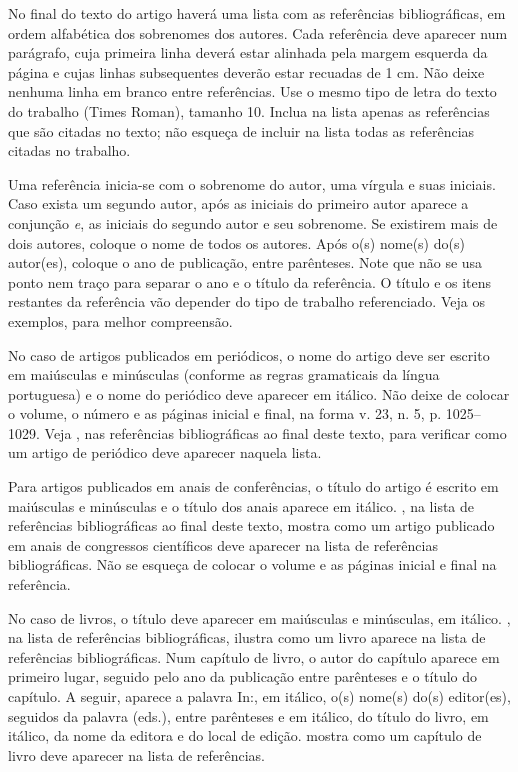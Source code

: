 \documentclass{anpet}
\begin{document}
No final do texto do artigo haverá uma lista com as referências bibliográficas, em ordem alfabética dos sobrenomes dos autores. Cada referência deve aparecer num parágrafo, cuja primeira linha deverá estar alinhada pela margem esquerda da página e cujas linhas subsequentes deverão estar recuadas de 1 cm. Não deixe nenhuma linha em branco entre referências. Use o mesmo tipo de letra do texto do trabalho (Times Roman), tamanho 10. Inclua na lista apenas as referências que são citadas no texto; não esqueça de incluir na lista todas as referências citadas no trabalho.

Uma referência inicia-se com o sobrenome do autor, uma vírgula e suas iniciais. Caso exista um segundo autor, após as iniciais do primeiro autor aparece a conjunção \textit{e}, as iniciais do segundo autor e seu sobrenome. Se existirem mais de dois autores, coloque o nome de todos os autores. Após o(s) nome(s) do(s) autor(es), coloque o ano de publicação, entre parênteses. Note que não se usa ponto nem traço para separar o ano e o título da referência. O título e os itens restantes da referência vão depender do tipo de trabalho referenciado. Veja os exemplos, para melhor compreensão.

No caso de artigos publicados em periódicos, o nome do artigo deve ser escrito em maiúsculas e minúsculas (conforme as regras gramaticais da língua portuguesa) e o nome do periódico deve aparecer em itálico. Não deixe de colocar o volume, o número e as páginas inicial e final, na forma v. 23, n. 5, p. 1025–1029. Veja \textcite{hong1996estimating}, nas referências bibliográficas ao final deste texto, para verificar como um artigo de periódico deve aparecer naquela lista. 

Para artigos publicados em anais de conferências, o título do artigo é escrito em maiúsculas e minúsculas e o título dos anais aparece em itálico. \textcite{fonseca1997transporte}, na lista de referências bibliográficas ao final deste texto, mostra como um artigo publicado em anais de congressos científicos deve aparecer na lista de referências bibliográficas. Não se esqueça de colocar o volume e as páginas inicial e final na referência.

No caso de livros, o título deve aparecer em maiúsculas e minúsculas, em itálico. \textcite{rosenberg1976logica}, na lista de referências bibliográficas, ilustra como um livro aparece na lista de referências bibliográficas. Num capítulo de livro, o autor do capítulo aparece em primeiro lugar, seguido pelo ano da publicação entre parênteses e o título do capítulo. A seguir, aparece a palavra In:, em itálico, o(s) nome(s) do(s) editor(es), seguidos da palavra (eds.), entre parênteses e em itálico, do título do livro, em itálico, da nome da editora e do local de edição. \textcite{Jonhson1990DiscreteChoice} mostra como um capítulo de livro deve aparecer na lista de referências.
\end{document}
